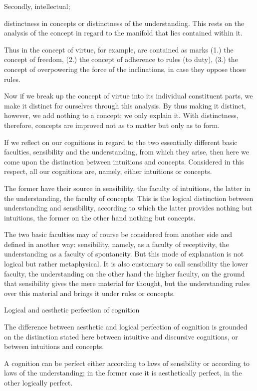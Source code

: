 Secondly, intellectual;

distinctness in concepts or distinctness of the understanding.
This rests on the analysis of the concept in regard to
the manifold that lies contained within it.

Thus in the concept of virtue, for example,
are contained as marks
(1.) the concept of freedom,
(2.) the concept of adherence to rules (to duty),
(3.) the concept of overpowering the force of the inclinations,
in case they oppose those rules.

    Now if we break up the concept of virtue
    into its individual constituent parts,
    we make it distinct for ourselves through this analysis.
    By thus making it distinct, however, we add nothing to a concept;
    we only explain it.
    With distinctness, therefore, concepts are improved
    not as to matter but only as to form.

If we reflect on our cognitions in regard to
the two essentially different basic faculties,
sensibility and the understanding, from which they arise,
then here we come upon the distinction
between intuitions and concepts.
Considered in this respect,
all our cognitions are, namely,
either intuitions or concepts.

The former have their source in sensibility, the faculty of intuitions,
the latter in the understanding, the faculty of concepts.
This is the logical distinction between understanding and sensibility,
according to which the latter provides nothing but intuitions,
the former on the other hand nothing but concepts.

    The two basic faculties may of course be considered
    from another side and defined in another way:
    sensibility, namely, as a faculty of receptivity,
    the understanding as a faculty of spontaneity.
    But this mode of explanation is not logical but rather metaphysical.
    It is also customary to call sensibility the lower faculty,
    the understanding on the other hand the higher faculty,
    on the ground that sensibility gives the mere material for thought,
    but the understanding rules over this material
    and brings it under rules or concepts.

Logical and aesthetic perfection of cognition

The difference between aesthetic and logical
perfection of cognition
is grounded on the distinction stated here
between intuitive and discursive cognitions, or
between intuitions and concepts.

A cognition can be perfect either
according to laws of sensibility or
according to laws of the understanding;
in the former case it is aesthetically perfect,
in the other logically perfect.


